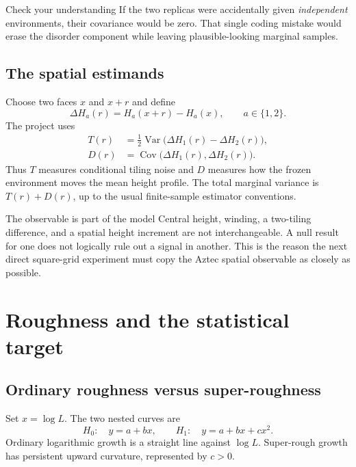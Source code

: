 \documentclass[11pt,a4paper,oneside,openany]{memoir}
\newcommand{\Var}{\operatorname{Var}}
\newcommand{\Cov}{\operatorname{Cov}}
\newcommand{\1}{\bm{1}}
\begin{document}
\begin{practicebox}{Check your understanding}
If the two replicas were accidentally given \emph{independent} environments,
their covariance would be zero. That single coding mistake would erase the
disorder component while leaving plausible-looking marginal samples.
\end{practicebox}

\section{The spatial estimands}

Choose two faces $x$ and $x+r$ and define
\[
  \Delta H_a(r)=H_a(x+r)-H_a(x),\qquad a\in\{1,2\}.
\]
The project uses
\begin{align*}
T(r)&=\frac12\Var\bigl(\Delta H_1(r)-\Delta H_2(r)\bigr),\\
D(r)&=\Cov\bigl(\Delta H_1(r),\Delta H_2(r)\bigr).
\end{align*}
Thus $T$ measures conditional tiling noise and $D$ measures how the frozen
environment moves the mean height profile. The total marginal variance is
$T(r)+D(r)$, up to the usual finite-sample estimator conventions.

\begin{warningbox}{The observable is part of the model}
Central height, winding, a two-tiling difference, and a spatial height
increment are not interchangeable. A null result for one does not logically
rule out a signal in another. This is the reason the next direct square-grid
experiment must copy the Aztec spatial observable as closely as possible.
\end{warningbox}

\chapter{Roughness and the statistical target}
\label{chap:roughness}

\section{Ordinary roughness versus super-roughness}

Set $x=\log L$. The two nested curves are
\[
  H_0:\quad y=a+bx,
  \qquad
  H_1:\quad y=a+bx+cx^2.
\]
Ordinary logarithmic growth is a straight line against $\log L$.
Super-rough growth has persistent upward curvature, represented by $c>0$.
\end{document}
